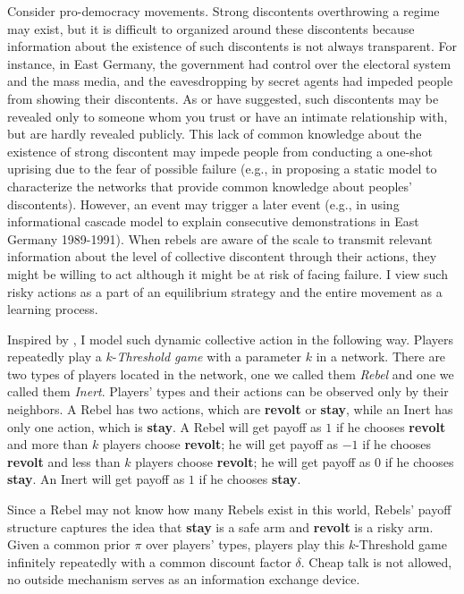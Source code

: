 \documentclass[12pt,letter]{article}
\theoremstyle{definition}
\theoremstyle{remark}
\theoremstyle{claim}
\begin{document}
Consider pro-democracy movements. Strong discontents overthrowing a regime may exist, but it is difficult to organized around these discontents because information about the existence of such discontents is not always transparent. For instance, in East Germany, the government had control over the electoral system and the mass media, and the eavesdropping by secret agents had impeded people from showing their discontents. As \citep{Karl-Dieter1993} or \citep{Chwe2000} have suggested, such discontents may be revealed only to someone whom you trust or have an intimate relationship with, but are hardly revealed publicly. This lack of common knowledge about the existence of strong discontent may impede people from conducting a one-shot uprising due to the fear of possible failure (e.g., \citep{Chwe2000} in proposing a static model to characterize the networks that provide common knowledge about peoples' discontents). However, an event may trigger a later event (e.g., \citep{Lohmann2011} in using informational cascade model to explain consecutive demonstrations in East Germany 1989-1991). When rebels are aware of the scale to transmit relevant information about the level of collective discontent through their actions, they might be willing to act although it might be at risk of facing failure. I view such risky actions as a part of an equilibrium strategy and the entire movement as a learning process. 




Inspired by \citep{Chwe2000}, I model such dynamic collective action in the following way. Players repeatedly play a $k$-\textit{Threshold game} with a parameter $k$ in a network. There are two types of players located in the network, one we called them \textit{Rebel} and one we called them \textit{Inert}.  Players' types and their actions can be observed only by their neighbors. A Rebel has two actions, which are \textbf{revolt} or \textbf{stay}, while an Inert has only one action, which is \textbf{stay}. A Rebel will get payoff as $1$ if he chooses \textbf{revolt} and more than $k$ players choose \textbf{revolt}; he will get payoff as $-1$ if he chooses \textbf{revolt} and less than $k$ players choose \textbf{revolt}; he will get payoff as $0$ if he chooses \textbf{stay}. An Inert will get payoff as $1$ if he chooses \textbf{stay}.

Since a Rebel may not know how many Rebels exist in this world, Rebels' payoff structure captures the idea that \textbf{stay} is a safe arm and \textbf{revolt} is a risky arm. Given a common prior $\pi$ over players' types, players play this $k$-Threshold game infinitely repeatedly with a common discount factor $\delta$. Cheap talk is not allowed, no outside mechanism serves as an information exchange device. 
\end{document}
